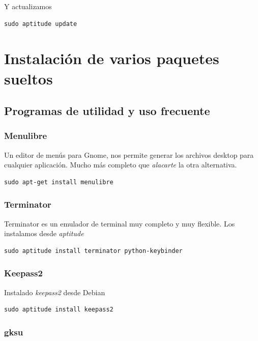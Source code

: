 \documentclass[12pt,spanish,]{article}
\begin{document}
Y actualizamos

\begin{verbatim}
sudo aptitude update
\end{verbatim}

\section{Instalación de varios paquetes
sueltos}\label{instalaciuxf3n-de-varios-paquetes-sueltos}

\subsection{Programas de utilidad y uso
frecuente}\label{programas-de-utilidad-y-uso-frecuente}

\subsubsection{Menulibre}\label{menulibre}

Un editor de menús para Gnome, nos permite generar los archivos desktop
para cualquier aplicación. Mucho más completo que \emph{alacarte} la
otra alternativa.

\begin{verbatim}
sudo apt-get install menulibre
\end{verbatim}

\subsubsection{Terminator}\label{terminator}

Terminator es un emulador de terminal muy completo y muy flexible. Los
instalamos desde \emph{aptitude}

\begin{verbatim}
sudo aptitude install terminator python-keybinder
\end{verbatim}

\subsubsection{Keepass2}\label{keepass2}

Instalado \emph{keepass2} desde Debian

\begin{verbatim}
sudo aptitude install keepass2
\end{verbatim}

\subsubsection{gksu}\label{gksu}
\end{document}
